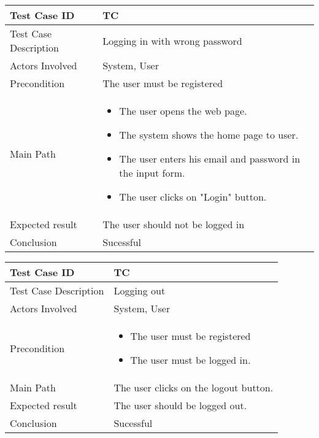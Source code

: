 \begin{center} \begin{tabular}{|l|l|}
  \hline
  Test Case ID & TC \z\\
  \hline
  Test Case Description & Logging in with wrong password\\
  \hline
  Actors Involved & System, User\\
   \hline
  Precondition & The user must be registered\\
  \hline
  Main Path &   \begin{minipage}{5in}
    \vskip 4pt
            \begin{itemize}
              \item The user opens the web page.
              \item The system shows the home page to user.
              \item The user enters his email and password in the input form.
              \item The user clicks on "Login" button.
            \end{itemize}
    \vskip 4pt
  \end{minipage}  \\
  \hline
  Expected result & The user should not be logged in\\
  \hline
  Conclusion & Sucessful\\
  \hline
\end{tabular} \end{center}

\begin{tabular}{|l|l|}
  \hline
  Test Case ID & TC \z\\
  \hline
  Test Case Description & Logging out\\
  \hline
  Actors Involved & System, User\\
   \hline
  Precondition & \begin{minipage}{5in}
    \vskip 4pt
            \begin{itemize}
               \item The user must be registered
               \item The user must be logged in.
  \end{itemize}
    \vskip 4pt
  \end{minipage} \\
  \hline
  Main Path &   The user clicks on the logout button. \\
  \hline
  Expected result & The user should be logged out.\\
  \hline
  Conclusion & Sucessful\\
  \hline
\end{tabular}